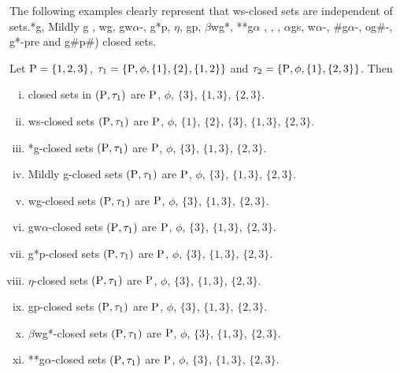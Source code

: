 \begin{rem}\label{rem2.2.16}
The following examples clearly represent that ws-closed sets are independent of sets.*g, Mildly g , wg, gw$\alpha$-, g*p, $\eta$, gp, $\beta$wg*, {*}{*}g$\alpha$ , , , $\alpha$gs, w$\alpha$-, $\#$g$\alpha$-, og$\#$-, g*-pre and g\#p\#) closed sets.
\end{rem}

\begin{exm}\label{exm2.2.17}
Let $\mathrm{P} = \{1, 2, 3\}$, $\tau_{1} = \{\mathrm{P}, \phi, \{1\}, \{2\},\{1, 2\}\}$ and $\tau_{2} = \{\mathrm{P}, \phi, \{1\}, \{2, 3\}\}$. Then
\begin{enumerate}[(i)]
\item closed sets in $(\mathrm{P}, \tau_{1})$ are $\mathrm{P}$, $\phi$, $\{3\}$, $\{1, 3\}$, $\{2, 3\}$.
\item ws-closed sets $(\mathrm{P}, \tau_{1})$ are $\mathrm{P}$, $\phi$, $\{1\}$, $\{2\}$, $\{3\}$, $\{1, 3\}$, $\{2, 3\}$.

\item *g-closed sets $(\mathrm{P}, \tau_{1})$ are $\mathrm{P}$, $\phi$, $\{3\}$, $\{1, 3\}$, $\{2, 3\}$.

\item Mildly g-closed sets $(\mathrm{P}, \tau_{1})$ are $\mathrm{P}$, $\phi$, $\{3\}$, $\{1, 3\}$, $\{2, 3\}$.

\item wg-closed sets $(\mathrm{P}, \tau_{1})$ are $\mathrm{P}$, $\phi$, $\{3\}$, $\{1, 3\}$, $\{2, 3\}$.

\item gw$\alpha$-closed sets $(\mathrm{P}, \tau_{1})$ are $\mathrm{P}$, $\phi$, $\{3\}$, $\{1, 3\}$, $\{2, 3\}$.

\item g*p-closed sets $(\mathrm{P}, \tau_{1})$ are $\mathrm{P}$, $\phi$, $\{3\}$, $\{1, 3\}$, $\{2, 3\}$.

\item $\eta$-closed sets $(\mathrm{P}, \tau_{1})$ are $\mathrm{P}$, $\phi$, $\{3\}$, $\{1, 3\}$, $\{2, 3\}$.

\item gp-closed sets $(\mathrm{P}, \tau_{1})$ are $\mathrm{P}$, $\phi$, $\{3\}$, $\{1, 3\}$, $\{2, 3\}$.

\item $\beta$wg*-closed sets $(\mathrm{P}, \tau_{1})$ are $\mathrm{P}$, $\phi$, $\{3\}$, $\{1, 3\}$, $\{2, 3\}$.

\item {*}{*}g$\alpha$-closed sets $(\mathrm{P}, \tau_{1})$ are $\mathrm{P}$, $\phi$, $\{3\}$, $\{1, 3\}$, $\{2, 3\}$.


\end{enumerate}
\end{exm}
